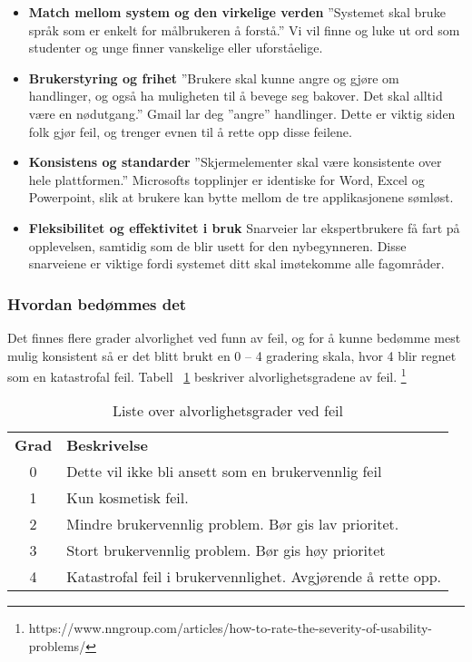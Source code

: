  \begin{itemize}
    \item \textbf{Match mellom system og den virkelige verden}   %
          ''Systemet skal bruke språk som er enkelt for målbrukeren å forstå.'' Vi vil finne og luke ut ord som studenter og unge finner vanskelige eller uforståelige.   %
    \item \textbf{Brukerstyring og frihet} 
            ''Brukere skal kunne angre og gjøre om handlinger, og også ha muligheten til å bevege seg bakover. Det skal alltid være en nødutgang.'' Gmail lar deg ''angre'' handlinger. Dette er viktig siden folk gjør feil, og trenger evnen til å rette opp disse feilene.
    \item \textbf{Konsistens og standarder}  %
          ''Skjermelementer skal være konsistente over hele plattformen.''
            Microsofts topplinjer er identiske for Word, Excel og Powerpoint, slik at brukere kan bytte mellom de tre applikasjonene sømløst.   %
    \item \textbf{Fleksibilitet og effektivitet i bruk} 
            Snarveier lar ekspertbrukere få fart på opplevelsen, samtidig som de blir usett for den nybegynneren. Disse snarveiene er viktige fordi systemet ditt skal imøtekomme alle fagområder.
\end{itemize}


\subsubsection{Hvordan bedømmes det}

Det finnes flere grader alvorlighet ved funn av feil, og for å kunne bedømme mest mulig konsistent så er det blitt brukt en 0 – 4 gradering skala, hvor 4 blir regnet som en katastrofal feil. Tabell ~\ref{table:heuristikkGrader} beskriver alvorlighetsgradene av feil.
\footnote{https://www.nngroup.com/articles/how-to-rate-the-severity-of-usability-problems/}


\begin{center}
\begin{table}[H]
\begin{tabular}{ c l }
 \textbf{Grad} & \textbf{Beskrivelse}  \\
 0 & Dette vil ikke bli ansett som en brukervennlig feil   \\
 1 & Kun kosmetisk feil. \\
 2 & Mindre brukervennlig problem. Bør gis lav prioritet.  \\
 3 & Stort brukervennlig problem. Bør gis høy prioritet  \\
 4 & Katastrofal feil i brukervennlighet. Avgjørende å rette opp.
\end{tabular}
 \caption{Liste over alvorlighetsgrader ved feil}
 \label{table:heuristikkGrader}
\end{table}
\end{center}


